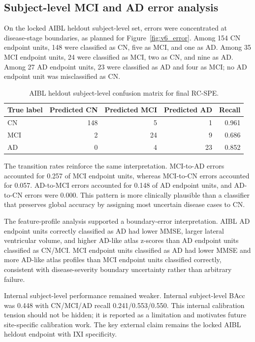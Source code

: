\documentclass[12pt,a4paper]{article}
\begin{document}
\subsection{Subject-level MCI and AD error analysis}
\label{sec:error_results}

On the locked AIBL heldout subject-level set, errors were concentrated at disease-stage boundaries, as planned for Figure~\ref{fig:v6_error}. Among 154 CN endpoint units, 148 were classified as CN, five as MCI, and one as AD. Among 35 MCI endpoint units, 24 were classified as MCI, two as CN, and nine as AD. Among 27 AD endpoint units, 23 were classified as AD and four as MCI; no AD endpoint unit was misclassified as CN.

\begin{table}[t]
\centering
\caption{AIBL heldout subject-level confusion matrix for final RC-SPE.}
\label{tab:v6_confusion}
\begin{tabular}{@{}lrrrr@{}}
\toprule
True label & Predicted CN & Predicted MCI & Predicted AD & Recall \\
\midrule
CN & 148 & 5 & 1 & 0.961 \\
MCI & 2 & 24 & 9 & 0.686 \\
AD & 0 & 4 & 23 & 0.852 \\
\bottomrule
\end{tabular}
\end{table}

The transition rates reinforce the same interpretation. MCI-to-AD errors accounted for 0.257 of MCI endpoint units, whereas MCI-to-CN errors accounted for 0.057. AD-to-MCI errors accounted for 0.148 of AD endpoint units, and AD-to-CN errors were 0.000. This pattern is more clinically plausible than a classifier that preserves global accuracy by assigning most uncertain disease cases to CN.

The feature-profile analysis supported a boundary-error interpretation. AIBL AD endpoint units correctly classified as AD had lower MMSE, larger lateral ventricular volume, and higher AD-like atlas z-scores than AD endpoint units classified as CN/MCI. MCI endpoint units classified as AD had lower MMSE and more AD-like atlas profiles than MCI endpoint units classified correctly, consistent with disease-severity boundary uncertainty rather than arbitrary failure.

Internal subject-level performance remained weaker. Internal subject-level BAcc was 0.448 with CN/MCI/AD recall 0.241/0.553/0.550. This internal calibration tension should not be hidden; it is reported as a limitation and motivates future site-specific calibration work. The key external claim remains the locked AIBL heldout endpoint with IXI specificity.
\end{document}
